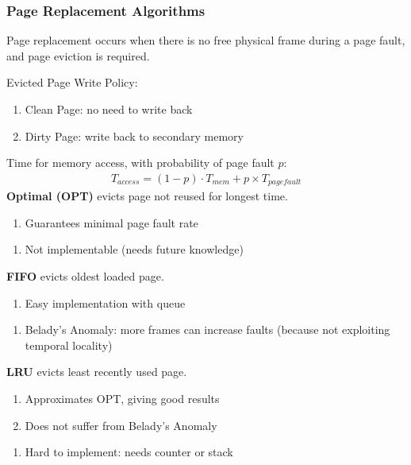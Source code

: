 \documentclass[12pt, a4paper]{article}
\begin{document}
\begin{multicols*}{3}
\colbreak
\subsubsection{Page Replacement Algorithms}

Page replacement occurs when there is no free physical frame during a page fault, and page eviction is required. 

Evicted Page Write Policy:
\begin{enumerate}[\roman*.]
  \item Clean Page: no need to write back
  \item Dirty Page: write back to secondary memory
\end{enumerate}

Time for memory access, with probability of page fault $p$:
\vspace{-3pt}
\begin{align*}
  T_{access} = (1-p)\cdot T_{mem} + p\times T_{page fault}
\end{align*}
\textbf{Optimal (OPT)} evicts page not reused for longest time.
\begin{enumerate}[$+$]
  \item Guarantees minimal page fault rate
\end{enumerate}\vspace{-1pt}
\begin{enumerate}[$-$]
  \item Not implementable (needs future knowledge)
\end{enumerate}

\textbf{FIFO} evicts oldest loaded page.
\begin{enumerate}[$+$]
  \item Easy implementation with queue
\end{enumerate}\vspace{-1pt}
\begin{enumerate}[$-$]
  \item Belady's Anomaly: more frames can increase faults (because not exploiting temporal locality)
\end{enumerate}

\textbf{LRU} evicts least recently used page.
\begin{enumerate}[$+$]
  \item Approximates OPT, giving good results
  \item Does not suffer from Belady's Anomaly
\end{enumerate}\vspace{-1pt}
\begin{enumerate}[$-$]
  \item Hard to implement: needs counter or stack
\end{enumerate}


\end{multicols*}
\end{document}
